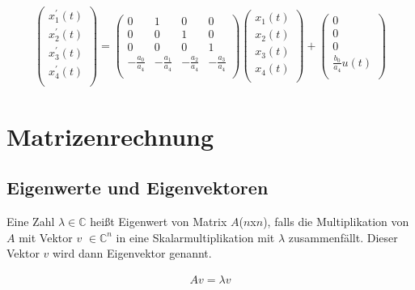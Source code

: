\documentclass[10pt,a4paper]{article}
\begin{document}
  \begin{mdframed}[style=exercise]
    \begin{align}
        \begin{pmatrix}
        x_1^{'}(t) \\
        x_2^{'}(t) \\
        x_3^{'}(t) \\
        x_4^{'}(t) \\
        \end{pmatrix} 
        =
        \begin{pmatrix}
            0 & 1 & 0 & 0 \\
            0 & 0 & 1 & 0 \\
            0 & 0 & 0 & 1 \\
            -\frac{a_0}{a_4} & -\frac{a_1}{a_4} & -\frac{a_2}{a_4} &  -\frac{a_3}{a_4}\\
        \end{pmatrix}
        \begin{pmatrix}
        x_1(t) \\
        x_2(t) \\
        x_3(t) \\
        x_4(t) \\
        \end{pmatrix} 
        +
        \begin{pmatrix}
        0 \\
        0 \\
        0 \\
        \frac{b_0}{a_4}u(t) \\
        \end{pmatrix} 
    \end{align}
  \end{mdframed}


\section{Matrizenrechnung}
\subsection{Eigenwerte und Eigenvektoren}
Eine Zahl $\lambda \in \mathbb{C}$ heißt Eigenwert von Matrix $A$($n$x$n$),
falls die Multiplikation von $A$ mit Vektor $v$ $\in \mathbb{C}^n$ in eine Skalarmultiplikation
mit $\lambda$ zusammenfällt. Dieser Vektor $v$ wird dann Eigenvektor genannt.
  \begin{mdframed}[style=exercise]
    \begin{align}
        Av = \lambda v
    \end{align}
  \end{mdframed}
\end{document}

